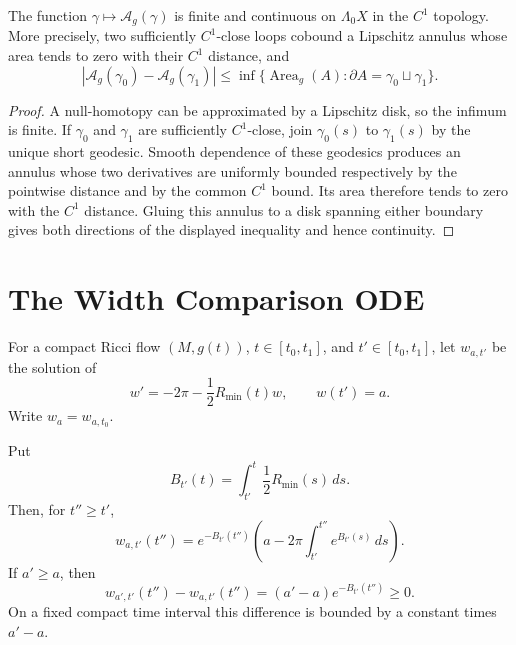 \begin{lemma}
\label{lem:least-spanning-area-continuity}
\notready
The function $\gamma\mapsto\mathcal A_g(\gamma)$ is finite and continuous
on $\Lambda_0X$ in the $C^1$ topology.  More precisely, two sufficiently
$C^1$-close loops cobound a Lipschitz annulus whose area tends to zero with
their $C^1$ distance, and
\[
 |\mathcal A_g(\gamma_0)-\mathcal A_g(\gamma_1)|
 \le\inf\{\operatorname{Area}_g(A):\partial A=\gamma_0\sqcup\gamma_1\}.
\]
\end{lemma}

\begin{proof}
A null-homotopy can be approximated by a Lipschitz disk, so the infimum is
finite.  If $\gamma_0$ and $\gamma_1$ are sufficiently $C^1$-close, join
$\gamma_0(s)$ to $\gamma_1(s)$ by the unique short geodesic.  Smooth
dependence of these geodesics produces an annulus whose two derivatives are
uniformly bounded respectively by the pointwise distance and by the common
$C^1$ bound.  Its area therefore tends to zero with the $C^1$ distance.
Gluing this annulus to a disk spanning either boundary gives both directions
of the displayed inequality and hence continuity.
\end{proof}

\section{The Width Comparison ODE}

\begin{definition}
\label{def:loop-width-comparison-ode}
\notready
For a compact Ricci flow $(M,g(t))$, $t\in[t_0,t_1]$, and
$t'\in[t_0,t_1]$, let $w_{a,t'}$ be the solution of
\[
 w'=-2\pi-\frac12R_{\min}(t)w,
 \qquad w(t')=a.
\]
Write $w_a=w_{a,t_0}$.
\end{definition}

\begin{lemma}
\label{lem:loop-width-ode-formula}
\notready
Put
\[
 B_{t'}(t)=\int_{t'}^t\frac12R_{\min}(s)\,ds.
\]
Then, for $t''\ge t'$,
\[
 w_{a,t'}(t'')=e^{-B_{t'}(t'')}
 \left(a-2\pi\int_{t'}^{t''}e^{B_{t'}(s)}\,ds\right).
\]
If $a'\ge a$, then
\[
 w_{a',t'}(t'')-w_{a,t'}(t'')
 =(a'-a)e^{-B_{t'}(t'')}\ge0.
\]
On a fixed compact time interval this difference is bounded by a constant
times $a'-a$.
\end{lemma}


